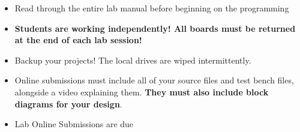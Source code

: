 \begin{itemize}
    \item Read through the entire lab manual before beginning on the programming
    \item \textbf{Students are working independently! All boards must be returned at the end of each lab session!}
    \item Backup your projects! The local drives are wiped intermittently. 
    \item Online submissions must include all of your source files and test bench files, alongside a video explaining them. \textbf{They must also include block diagrams for your design}. 
    \item Lab Online Submissions are due \labThreeSimsDue
    
\end{itemize}